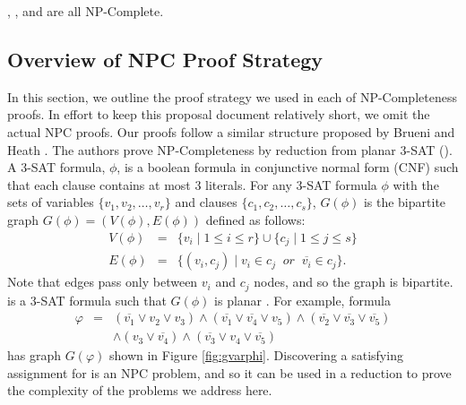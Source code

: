 \begin{theorem}
\maxincs, \xvalparts, \full and \xval are all NP-Complete.
\label{thm:pmu-npc}
\end{theorem}



\subsection{Overview of NPC Proof Strategy}
\label{subsec:proofstrat}
In this section, we outline the proof strategy we used in each of NP-Completeness proofs.  In effort to keep this proposal document relatively short, we omit the actual NPC proofs. 
Our proofs follow a similar structure proposed by Brueni and Heath \cite{Brueni05}. The authors prove NP-Completeness by reduction from planar 3-SAT (\sats).
A 3-SAT formula, $\phi$, is a boolean formula in conjunctive normal form (CNF) such 
that each clause contains at most $3$ literals. For any 3-SAT formula $\phi$ with the sets of variables $\{v_1,v_2, \dots , v_r\}$ and clauses $\{c_1,c_2, \dots , c_s \}$, $G(\phi)$ 
is the bipartite graph $G(\phi)=(V(\phi),E(\phi))$ defined as follows:
\begin{eqnarray*}
 V(\phi) &= &\{v_i\; \vert\; 1 \leq i \leq r \} \cup \{c_j \;\vert\; 1 \leq j \leq s \} \\
 E(\phi) &=& \{ (v_i,c_j)\;\vert\; v_i \in c_j\;\; or \;\; \overline{v_i} \in c_j\}.
\end{eqnarray*}
Note that edges pass only between $v_i$ and $c_j$ nodes, and so the graph is bipartite.  \sat is a 3-SAT formula such that $G(\phi)$ is planar \cite{Lich82}. 
For example, \sat formula
\begin{eqnarray}
\varphi  &=& (\overline{v_1} \vee v_2 \vee v_3) \wedge (\overline{v_1} \vee \overline{v_4} \vee v_5) \wedge (\overline{v_2} \vee \overline{v_3} \vee \overline{v_5}) \nonumber\\
		 & & \wedge (v_3 \vee \overline{v_4}) \wedge  (\overline{v_3} \vee v_4 \vee \overline{v_5})
\label{eqn:varphi}
\end{eqnarray}
has graph $G(\varphi)$ shown in Figure \ref{fig:gvarphi}. 
Discovering a satisfying assignment for  \sat is an NPC problem, and so it can be used in a reduction to prove the complexity of the problems we address here. 

